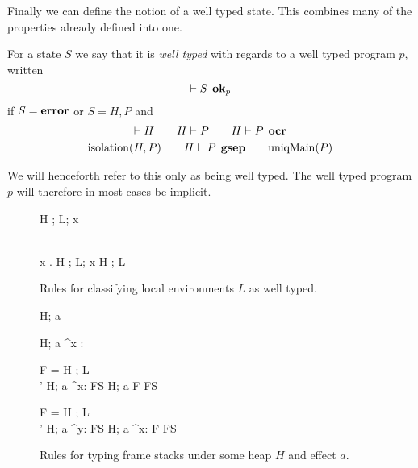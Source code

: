 Finally we can define the notion of a well typed state. This combines many of
the properties already defined into one.
\begin{definition}
  For a state $S$ we say that it is \emph{well typed} with regards to a well typed
  program $p$, written
  \begin{equation}
    \vdash S \:\: \mbox{{\bf ok}$_p$}
  \end{equation}
  if $S = \mbox{{\bf error}}$ or $S = H, P$ and
  \begin{equation*}
    \begin{gathered}
      \vdash H \quad\quad H \vdash P \quad\quad H \vdash P \:\: \mbox{\bf ocr} \\
      \mbox{$\mathrm{isolation}$}{(H, P)} \quad\quad H \vdash P \:\: \mbox{\bf gsep} \quad\quad \mbox{$\mathrm{uniqMain}$}(P)
    \end{gathered}
  \end{equation*}
\end{definition}

\begin{remark}
  We will henceforth refer to this only as being well typed. The well typed
  program $p$ will therefore in most cases be implicit.
\end{remark}

\begin{figure}
  {}
  { H \vdash \Gamma; L; x }

  \RuleSpace{}

  {\dom{(\Gamma)} \subseteq {} \\
    \forall x \in \dom{(\Gamma)}. \: H \vdash \Gamma; L; x 
  }
  { H \vdash \Gamma; L }

  \caption{Rules for classifying local environments $L$ as well typed.}
  \label{fig:local_typing}
\end{figure}

\begin{figure}
  {H; a \vdash \varepsilon}

  \RuleSpace{}

  {H; a \vdash^{x : \sigma} \varepsilon}

  \RuleSpace{}

  { F =  \andalso H \vdash \Gamma; L \\
   \andalso \sigma' \stof \sigma \andalso H; a \vdash^{x: \sigma} FS }
  { H; a \vdash F \circ FS }
  
  \RuleSpace{}

  { F =  \andalso H \vdash \Gamma; L \\
   \andalso \sigma' \stof \sigma 
  \andalso H; a \vdash^{y: \sigma} FS }
  { H; a \vdash^{x: \tau} F \circ FS }

  \caption{Rules for typing frame stacks under some heap $H$ and effect $a$.}
  \label{fig:fs_typing}
\end{figure}

